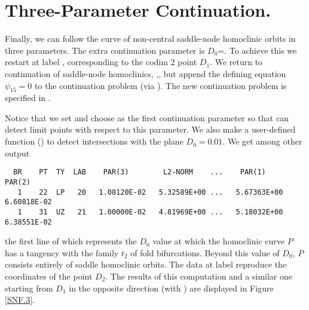 \documentclass[12pt]{report}
\begin{document}
\section{Three-Parameter Continuation.}
Finally, we can follow the curve of non-central saddle-node homoclinic
orbits in three parameters. The extra continuation parameter is
$D_0$=.  To achieve this we restart at label ,
corresponding to the codim 2 point $D_1$. We return to continuation of
saddle-node homoclinics, ,, but append the
defining equation $\psi_{15}=0$ to the continuation problem
(via ). The new
continuation problem is specified in .
\begin{center}
\end{center}
Notice that we set  and choose  as the first 
continuation parameter so that \AUTO can detect limit points 
with respect to this parameter. We also make a user-defined function
()
to detect intersections with the plane $D_0=0.01$.
We get among other output
\begin{verbatim}
  BR    PT  TY  LAB    PAR(3)        L2-NORM    ...    PAR(1)        PAR(2)
   1    22  LP   20   1.08120E-02   5.32589E+00 ...   5.67363E+00   6.60818E-02
   1    31  UZ   21   1.00000E-02   4.81969E+00 ...   5.18032E+00   6.38551E-02
\end{verbatim}
the first line of which represents the $D_0$ value at which 
the homoclinic curve $P$ has a tangency with the family $t_2$ 
of fold bifurcations. Beyond this value of $D_0$,
$P$ consists entirely of saddle homoclinic orbits. The data at label  
reproduce the coordinates of the point $D_2$. The results of this
computation and a similar one starting from $D_1$ in the opposite direction
(with ) are displayed in Figure \ref{SNF.3}.
%
\end{document}
